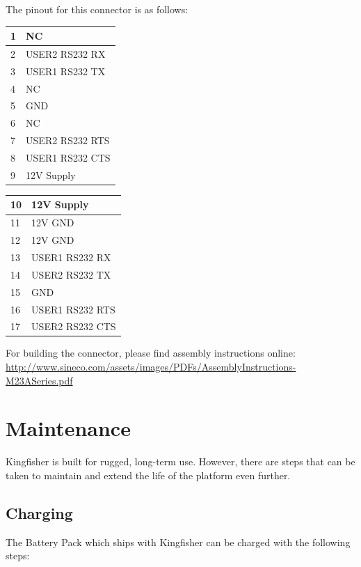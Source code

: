 \documentclass[]{clearpath-latex/clearpath-manual}
\begin{document}
The pinout for this connector is as follows:
\bgroup
\def\arraystretch{1.5}%
\begin{table}[h]
\centering
\label{my-label}
\begin{tabular}{|l|l|} 
\hline
\rowcolor{lightgrey} 
1  & NC              \\ \hline
2  & USER2 RS232 RX  \\ \hline
3  & USER1 RS232 TX  \\ \hline
\rowcolor{lightgrey} 
4  & NC              \\ \hline
5  & GND             \\ \hline
\rowcolor{lightgrey} 
6  & NC              \\ \hline
7  & USER2 RS232 RTS \\ \hline
8  & USER1 RS232 CTS \\ \hline
9  & 12V Supply      \\ \hline
\end{tabular}
\quad
\begin{tabular}{|l|l|} 
\hline
10 & 12V Supply      \\ \hline
11 & 12V GND         \\ \hline
12 & 12V GND         \\ \hline
13 & USER1 RS232 RX  \\ \hline
14 & USER2 RS232 TX  \\ \hline
15 & GND             \\ \hline
16 & USER1 RS232 RTS \\ \hline
17 & USER2 RS232 CTS \\ \hline
\end{tabular}
\end{table}
\egroup

For building the connector, please find assembly instructions online: \url{http://www.sineco.com/assets/images/PDFs/AssemblyInstructions-M23ASeries.pdf}

\newpage

\section{Maintenance}
Kingfisher is built for rugged, long-term use. However, there are steps that can be taken to maintain and extend the life of the platform even further.

\subsection{Charging}
The Battery Pack which ships with Kingfisher can be charged with the following steps:
\end{document}
